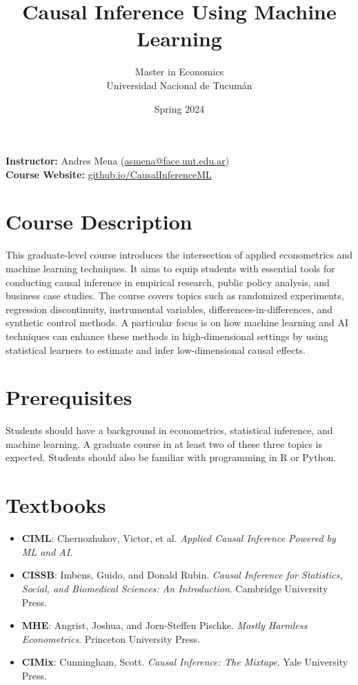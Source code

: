 \documentclass[12pt]{article}
\title{Causal Inference Using Machine Learning}
\author{\large Master in Economics \\ Universidad Nacional de Tucumán}
\date{\large Spring 2024}
\begin{document}
\maketitle

\noindent
\textbf{Instructor:} Andres Mena (\href{mailto:asmena@face.unt.edu.ar}{asmena@face.unt.edu.ar}) \\[0.5em]
\textbf{Course Website:} \small \href{http://www.github.io/CausalInferenceML}{\textcolor{myblue}{github.io/CausalInferenceML}}
\section*{Course Description}

This graduate-level course introduces the intersection of applied econometrics and machine learning techniques. It aims to equip students with essential tools for conducting causal inference in empirical research, public policy analysis, and business case studies. The course covers topics such as randomized experiments, regression discontinuity, instrumental variables, differences-in-differences, and synthetic control methods. A particular focus is on how machine learning and AI techniques can enhance these methods in high-dimensional settings by using statistical learners to estimate and infer low-dimensional causal effects.

\section*{Prerequisites}
Students should have a background in econometrics, statistical inference, and machine learning. A graduate course in at least two of these three topics is expected. Students should also be familiar with programming in R or Python.

\section*{Textbooks}
\begin{itemize}
    \item \textbf{CIML}: Chernozhukov, Victor, et al. \textit{Applied Causal Inference Powered by ML and AI}.
    \item \textbf{CISSB}: Imbens, Guido, and Donald Rubin. \textit{Causal Inference for Statistics, Social, and Biomedical Sciences: An Introduction}. Cambridge University Press.
    \item \textbf{MHE}: Angrist, Joshua, and Jorn-Steffen Pischke. \textit{Mostly Harmless Econometrics}. Princeton University Press.
    \item \textbf{CIMix}: Cunningham, Scott. \textit{Causal Inference: The Mixtape}. Yale University Press.
\end{itemize}
\end{document}
